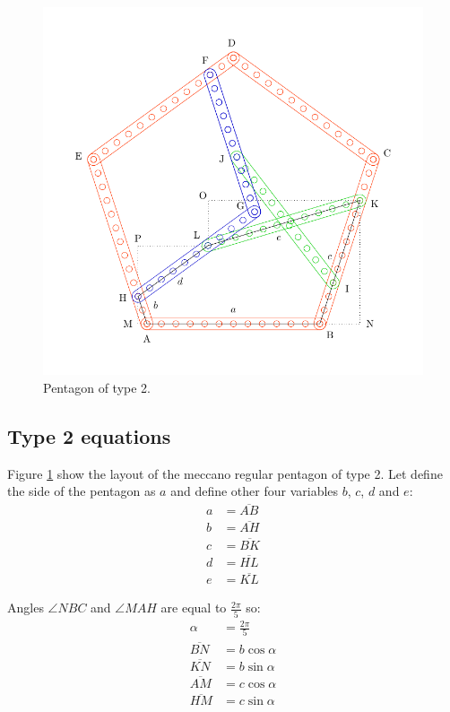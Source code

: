\documentclass[11pt]{article}
\begin{document}
\begin{figure}[htpb]
\centering
\includegraphics[scale=0.75]{penta-type-2}
\caption{Pentagon of type 2.}
\label{fig:type-2}
\end{figure}

\subsection{Type 2 equations}

Figure \ref{fig:type-2} show the layout of the meccano regular pentagon of type 2.
Let define the side of the pentagon as $a$ and define other four variables $b$, $c$, $d$ and $e$:
\begin{align*}
a &= \overline{AB}\\
b &= \overline{AH}\\
c &= \overline{BK}\\
d &= \overline{HL}\\
e &= \overline{KL}
\end{align*}

Angles $\angle{NBC}$ and $\angle{MAH}$ are equal to $\frac{2\pi}{5}$ so:
\begin{align*}
\alpha &= \frac{2\pi}{5}\\
\overline{BN} &= b\cos{\alpha}\\
\overline{KN} &= b\sin{\alpha}\\
\overline{AM} &= c\cos{\alpha}\\
\overline{HM} &= c\sin{\alpha}
\end{align*}
\end{document}
